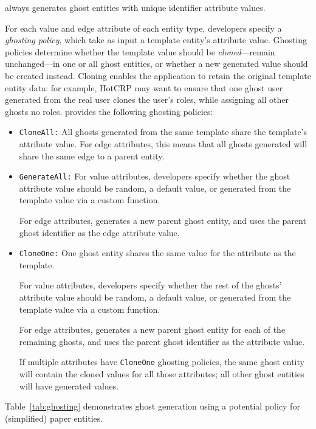 \sys always generates ghost entities with unique identifier attribute values.

For each value and edge attribute of each entity type, developers specify a \emph{ghosting policy},
which take as input a template entity's attribute value.  Ghosting policies determine whether the
template value should be \emph{cloned}---remain unchanged---in one or all ghost entities, or whether
a new generated value should be created instead. Cloning enables the application to retain
the original template entity data: for example, HotCRP may want to ensure that one ghost user
generated from the real user clones the user's roles, while assigning all other ghosts no roles.
\sys provides the following ghosting policies:
\begin{itemize}
    \item \texttt{CloneAll:} All ghosts generated from the same template share the template's 
        attribute value. For edge attributes, this means that all ghosts generated will share the
        same edge to a parent entity.

    \item \texttt{GenerateAll:} 
        For value attributes, developers specify whether the ghost attribute value should be
        random, a default value, or generated from the template value via a custom function.
        
        For edge attributes, \sys generates a new parent ghost entity, and uses the parent ghost
        identifier as the edge attribute value.

    \item \texttt{CloneOne:} One ghost entity shares the same value for the attribute as the
        template. 
        
        For value attributes, developers specify whether the rest of the ghosts' attribute value should be
        random, a default value, or generated from the template value via a custom function.

        For edge attributes, \sys generates a new parent ghost entity for each of the remaining
        ghosts, and uses the parent ghost identifier as the attribute value.

        If multiple attributes have \texttt{CloneOne} ghosting policies, the same ghost entity will
        contain the cloned values for all those attributes; all other ghost entities will have
        generated values.
\end{itemize}
Table~\ref{tab:ghosting} demonstrates ghost generation using a potential policy for (simplified) paper entities.

